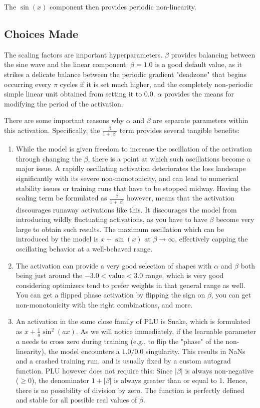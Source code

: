 \documentclass[11pt, letterpaper]{article}
\begin{document}
The $\sin(x)$ component then provides periodic non-linearity.

\subsection{Choices Made}

The scaling factors are important hyperparameters. $\beta$ provides balancing between the sine wave and the linear component. $\beta=1.0$ is a good default value, as it strikes a delicate balance between the periodic gradient "deadzone" that begins occurring every $\pi$ cycles if it is set much higher, and the completely non-periodic simple linear unit obtained from setting it to $0.0$. $\alpha$ provides the means for modifying the period of the activation.

There are some important reasons why $\alpha$ and $\beta$ are separate parameters within this activation. Specifically, the $\frac{\beta}{1 + \lvert\beta\rvert}$ term provides several tangible benefits:
\begin{enumerate}
    \item While the model is given freedom to increase the oscillation of the activation through changing the $\beta$, there is a point at which such oscillations become a major issue. A rapidly oscillating activation deteriorates the loss landscape significantly with its severe non-monotonicity, and can lead to numerical stability issues or training runs that have to be stopped midway. Having the scaling term be formulated as $\frac{\beta}{1 + \lvert\beta\rvert}$ however, means that the activation discourages runaway activations like this. It discourages the model from introducing wildly fluctuating activations, as you have to have $\beta$ become very large to obtain such results. The maximum oscillation which can be introduced by the model is $x + \sin(x)$ at $\beta \to \infty$, effectively capping the oscillating behavior at a well-behaved range.
    \item The activation can provide a very good selection of shapes with $\alpha$ and $\beta$ both being just around the $-3.0 < \text{value} < 3.0$ range, which is very good considering optimizers tend to prefer weights in that general range as well. You can get a flipped phase activation by flipping the sign on $\beta$, you can get non-monotonicity with the right combinations, and more.
    \item An activation in the same close family of PLU is Snake, which is formulated as $x + \frac{1}{a} \sin^2(ax)$. As we will notice immediately, if the learnable parameter $a$ needs to cross zero during training (e.g., to flip the "phase" of the non-linearity), the model encounters a $1.0/0.0$ singularity. This results in NaNs and a crashed training run, and is usually fixed by a custom autograd function. PLU however does not require this: Since $\lvert\beta\rvert$ is always non-negative ($\ge 0$), the denominator $1 + \lvert\beta\rvert$ is always greater than or equal to 1. Hence, there is no possibility of division by zero. The function is perfectly defined and stable for all possible real values of $\beta$.
\end{enumerate}
\end{document}
